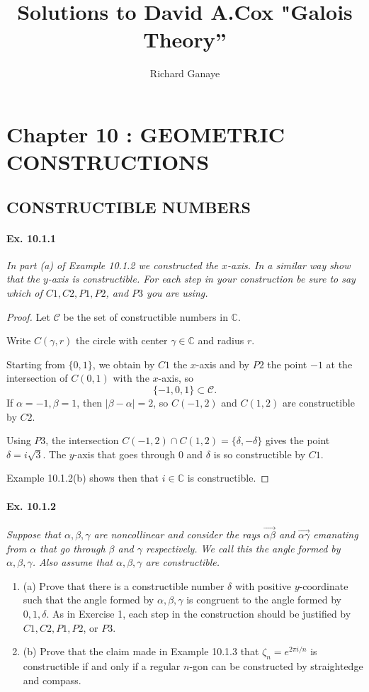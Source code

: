 \documentclass[11pt,a4paper]{article}
\title{Solutions to David A.Cox  "Galois Theory''}
\author{Richard Ganaye}
\newcommand{\be} {\begin{enumerate}}
\newcommand{\ee} {\end{enumerate}}
\newcommand{\C}{\mathbb{C}}
\begin{document}
\maketitle

\section{Chapter 10 : GEOMETRIC CONSTRUCTIONS}

\subsection{CONSTRUCTIBLE NUMBERS}

\paragraph{Ex. 10.1.1}

{\it In part (a) of Example 10.1.2 we constructed the $x$-axis. In a similar way show that the $y$-axis is constructible. For each step in your construction be sure to say which of $C1,C2,P1,P2$, and $P3$ you are using.
}

\begin{proof}
Let $ \mathscr{C}$ be the set of constructible numbers in $\C$.

Write $C(\gamma,r)$ the circle with center $\gamma \in \C$ and radius $r$.

Starting from $ \{0,1\}$, we obtain by $C1$ the $x$-axis and by $P2$ the point $-1$ at the intersection of $C(0,1)$ with the $x$-axis, so
$$ \{-1,0,1\} \subset {\mathscr{C}}.$$
If $\alpha = -1, \beta = 1$, then $|\beta - \alpha| = 2$, so $C(-1,2)$ and $C(1,2)$ are constructible by $C2$.

Using $P3$, the intersection $C(-1,2) \cap C(1,2)=\{\delta, - \delta\}$ gives the point $\delta = i\sqrt{3}$. The $y$-axis that goes through $0$ and $\delta$ is so constructible by $C1$.

Example 10.1.2(b) shows then that $i \in \C$ is  constructible. 
\end{proof}

\paragraph{Ex. 10.1.2}

{\it Suppose that $\alpha,\beta,\gamma$ are noncollinear and consider the rays $\overrightarrow{\alpha \beta}$ and $\overrightarrow{\alpha \gamma}$ emanating from $\alpha$ that go through $\beta$ and $\gamma$ respectively. We call this the angle formed by $\alpha,\beta,\gamma$. Also assume that $\alpha, \beta,\gamma$ are constructible.
\be
\item[(a)] Prove that there is a constructible number $\delta$ with positive $y$-coordinate such that the angle formed by $\alpha,\beta,\gamma$ is congruent to the angle formed by $0,1,\delta$. As in Exercise 1, each step in the construction should be justified by $C1,C2,P1,P2$, or $P3$.
\item[(b)] Prove that the claim made in Example 10.1.3 that $\zeta_n = e^{2\pi i/n}$ is constructible if and only if a regular $n$-gon can be constructed by straightedge and compass.
\ee
}
\end{document}
